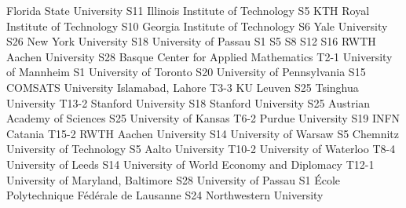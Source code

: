 \begin{multicols}{2}
{Florida State University}
{S11}
{}
{}
{}
{}
{}
{}
{Illinois Institute of Technology}
{S5}
{}
{}
{}
{}
{}
{}
{KTH Royal Institute of Technology}
{S10}
{}
{}
{}
{}
{}
{}
{Georgia Institute of Technology}
{S6}
{}
{}
{}
{}
{}
{}
{Yale University}
{S26}
{}
{}
{}
{}
{}
{}
{New York University}
{S18}
{}
{}
{}
{}
{}
{}
{University of Passau}
{S1}
{S5}
{S8}
{S12}
{S16}
{}
{}
{RWTH Aachen University}
{S28}
{}
{}
{}
{}
{}
{}
{Basque Center for Applied Mathematics}
{T2-1}
{}
{}
{}
{}
{}
{}
{University of Mannheim}
{S1}
{}
{}
{}
{}
{}
{}
{University of Toronto}
{S20}
{}
{}
{}
{}
{}
{}
{University of Pennsylvania}
{S15}
{}
{}
{}
{}
{}
{}
{COMSATS University Islamabad, Lahore}
{T3-3}
{}
{}
{}
{}
{}
{}
{KU Leuven}
{S25}
{}
{}
{}
{}
{}
{}
{Tsinghua University}
{T13-2}
{}
{}
{}
{}
{}
{}
{Stanford University}
{S18}
{}
{}
{}
{}
{}
{}
{Stanford University}
{S25}
{}
{}
{}
{}
{}
{}
{Austrian Academy of Sciences}
{S25}
{}
{}
{}
{}
{}
{}
{University of Kansas}
{T6-2}
{}
{}
{}
{}
{}
{}
{Purdue University}
{S19}
{}
{}
{}
{}
{}
{}
{INFN Catania}
{T15-2}
{}
{}
{}
{}
{}
{}
{RWTH Aachen University}
{S14}
{}
{}
{}
{}
{}
{}
{University of Warsaw}
{S5}
{}
{}
{}
{}
{}
{}
{Chemnitz University of Technology}
{S5}
{}
{}
{}
{}
{}
{}
{Aalto University}
{T10-2}
{}
{}
{}
{}
{}
{}
{University of Waterloo}
{T8-4}
{}
{}
{}
{}
{}
{}
{University of Leeds}
{S14}
{}
{}
{}
{}
{}
{}
{University of World Economy and Diplomacy}
{T12-1}
{}
{}
{}
{}
{}
{}
{University of Maryland, Baltimore}
{S28}
{}
{}
{}
{}
{}
{}
{University of Passau}
{S1}
{}
{}
{}
{}
{}
{}
{École Polytechnique Fédérale de Lausanne}
{S24}
{}
{}
{}
{}
{}
{}
{Northwestern University}

\end{multicols}
